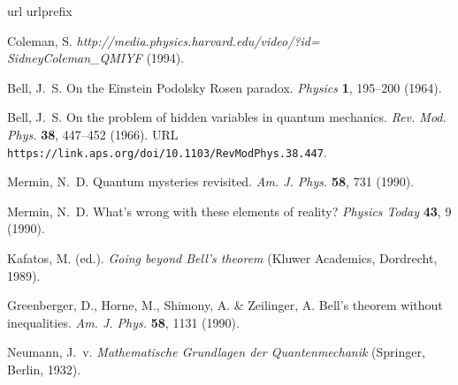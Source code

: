 \documentclass[12pt,nofootinbib]{revtex4}
\begin{document}
\begin{thebibliography}{10}
\expandafter\ifx\csname url\endcsname\relax
  \def\url#1{\texttt{#1}}\fi
\expandafter\ifx\csname urlprefix\endcsname\relax\def\urlprefix{URL }\fi
\providecommand{\bibinfo}[2]{#2}
\providecommand{\eprint}[2][]{\url{#2}}

\bibinfo{author}{Coleman, S.}
\newblock \emph{\bibinfo{journal}{http://media.physics.harvard.edu/video/?id=
  SidneyColeman\_QMIYF}}  (\bibinfo{year}{1994}).

\bibinfo{author}{Bell, J.~S.}
\newblock \bibinfo{title}{On the Einstein Podolsky Rosen paradox}.
\newblock \emph{\bibinfo{journal}{Physics}} \textbf{\bibinfo{volume}{1}},
  \bibinfo{pages}{195--200} (\bibinfo{year}{1964}).

\bibinfo{author}{Bell, J.~S.}
\newblock \bibinfo{title}{On the problem of hidden variables in quantum
  mechanics}.
\newblock \emph{\bibinfo{journal}{Rev. Mod. Phys.}}
  \textbf{\bibinfo{volume}{38}}, \bibinfo{pages}{447--452}
  (\bibinfo{year}{1966}).
\newblock \urlprefix\url{https://link.aps.org/doi/10.1103/RevModPhys.38.447}.

\bibinfo{author}{Mermin, N.~D.}
\newblock \bibinfo{title}{Quantum mysteries revisited}.
\newblock \emph{\bibinfo{journal}{Am. J. Phys.}} \textbf{\bibinfo{volume}{58}},
  \bibinfo{pages}{731} (\bibinfo{year}{1990}).

\bibinfo{author}{Mermin, N.~D.}
\newblock \bibinfo{title}{What's wrong with these elements of reality?}
\newblock \emph{\bibinfo{journal}{Physics Today}}
  \textbf{\bibinfo{volume}{43}}, \bibinfo{pages}{9} (\bibinfo{year}{1990}).

\bibinfo{editor}{Kafatos, M.} (ed.).
\newblock \emph{\bibinfo{title}{Going beyond Bell’s theorem}}
  (\bibinfo{publisher}{Kluwer Academics}, \bibinfo{address}{Dordrecht},
  \bibinfo{year}{1989}).

\bibinfo{author}{Greenberger, D.}, \bibinfo{author}{Horne, M.},
  \bibinfo{author}{Shimony, A.} \& \bibinfo{author}{Zeilinger, A.}
\newblock \bibinfo{title}{Bell’s theorem without inequalities}.
\newblock \emph{\bibinfo{journal}{Am. J. Phys.}} \textbf{\bibinfo{volume}{58}},
  \bibinfo{pages}{1131} (\bibinfo{year}{1990}).

\bibinfo{author}{Neumann, J.~v.}
\newblock \emph{\bibinfo{title}{{M}athematische {G}rundlagen der
  {Q}uantenmechanik}} (\bibinfo{publisher}{Springer},
  \bibinfo{address}{Berlin}, \bibinfo{year}{1932}).


\end{thebibliography}
\end{document}
